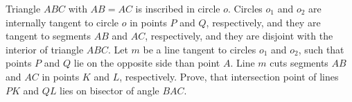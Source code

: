 Triangle $ABC$ with $AB = AC$ is inscribed in circle $o$. Circles $o_1$ and $o_2$ are internally tangent to circle $o$ in points $P$ and $Q$, respectively, and they are tangent to segments $AB$ and $AC$, respectively, and they are disjoint with the interior of triangle $ABC$. Let $m$ be a line tangent to circles $o_1$ and $o_2$, such that points $P$ and $Q$ lie on the opposite side than point $A$. Line $m$ cuts segments $AB$ and $AC$ in points $K$ and $L$, respectively. Prove, that intersection point of lines $PK$ and $QL$ lies on bisector of angle $BAC$.
